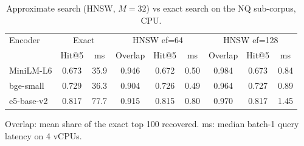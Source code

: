 \begin{table}[t]
\centering
\small
\caption{Approximate search (HNSW, $M{=}32$) vs exact search on the NQ sub-corpus, CPU.}
\label{tab:hnsw}
\begin{tabular}{lcccccccc}
\toprule
Encoder & \multicolumn{2}{c}{Exact} & \multicolumn{3}{c}{HNSW ef=64} & \multicolumn{3}{c}{HNSW ef=128} \\ & Hit@5 & ms & Overlap & Hit@5 & ms & Overlap & Hit@5 & ms \\
\midrule
MiniLM-L6 & 0.673 & 35.9 & 0.946 & 0.672 & 0.50 & 0.984 & 0.673 & 0.84 \\
bge-small & 0.729 & 36.3 & 0.904 & 0.726 & 0.49 & 0.964 & 0.727 & 0.89 \\
e5-base-v2 & 0.817 & 77.7 & 0.915 & 0.815 & 0.80 & 0.970 & 0.817 & 1.45 \\
\bottomrule
\end{tabular}
\par\smallskip\parbox{\linewidth}{\footnotesize Overlap: mean share of the exact top 100 recovered. ms: median batch-1 query latency on 4 vCPUs.}
\end{table}
